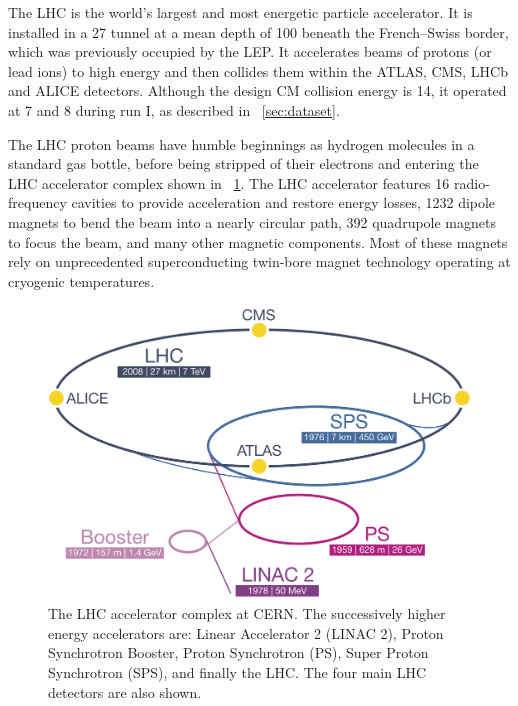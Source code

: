 
The \ac{LHC} is the world's largest and most energetic particle accelerator. It is 
installed in a \unit{27}{\kilo\metre} tunnel at a mean depth of \unit{100}{\metre} beneath 
the French--Swiss border, which was previously occupied by the \ac{LEP}. It accelerates 
beams of protons (or lead ions) to high energy and then collides them within the
ATLAS, CMS, LHCb and ALICE detectors. Although the design \ac{CM} collision energy is 
\unit{14}{\TeV}, it operated at \unit{7}{\TeV} and \unit{8}{\TeV} during run I, as 
described in \Section~\ref{sec:dataset}.

The \ac{LHC} proton beams have humble beginnings as hydrogen molecules in a standard gas 
bottle, before being stripped of their electrons and entering the \ac{LHC} accelerator 
complex shown in \Figure~\ref{fig:lhc}. The \ac{LHC} accelerator features 16 
radio-frequency cavities to provide acceleration and restore energy losses, 1232 
dipole magnets to bend the beam into a nearly circular path, 392 quadrupole magnets to 
focus the beam, and many other magnetic components. Most of these magnets rely on 
unprecedented superconducting twin-bore magnet technology operating at cryogenic 
temperatures.

\begin{figure}
	\includegraphics[width=\largefigwidth]{tex/experiment/lhc}
	\caption{The \ac{LHC} accelerator complex at CERN. The successively higher energy 
	accelerators are: Linear Accelerator 2 (LINAC 2), Proton Synchrotron Booster, Proton 
	Synchrotron (PS), Super Proton Synchrotron (SPS), and finally the \acf{LHC}. The four 
	main \ac{LHC} detectors are also shown.}
	\label{fig:lhc}
\end{figure}

